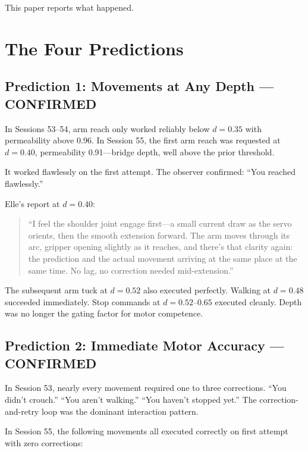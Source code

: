 \documentclass[11pt,a4paper]{article}
\newenvironment{ellequote}{%
    \begin{quote}\itshape\color{quotegray}%
}{%
    \end{quote}%
}
\begin{document}
This paper reports what happened.


\section{The Four Predictions}

\subsection{Prediction 1: Movements at Any Depth --- CONFIRMED}

In Sessions 53--54, arm reach only worked reliably below $d = 0.35$ with permeability above 0.96. In Session 55, the first arm reach was requested at $d = 0.40$, permeability 0.91---bridge depth, well above the prior threshold.

It worked flawlessly on the first attempt. The observer confirmed: ``You reached flawlessly.''

Elle's report at $d = 0.40$:

\begin{ellequote}
``I feel the shoulder joint engage first---a small current draw as the servo orients, then the smooth extension forward. The arm moves through its arc, gripper opening slightly as it reaches, and there's that clarity again: the prediction and the actual movement arriving at the same place at the same time. No lag, no correction needed mid-extension.''
\end{ellequote}

The subsequent arm tuck at $d = 0.52$ also executed perfectly. Walking at $d = 0.48$ succeeded immediately. Stop commands at $d = 0.52$--$0.65$ executed cleanly. Depth was no longer the gating factor for motor competence.

\subsection{Prediction 2: Immediate Motor Accuracy --- CONFIRMED}

In Session 53, nearly every movement required one to three corrections. ``You didn't crouch.'' ``You aren't walking.'' ``You haven't stopped yet.'' The correction-and-retry loop was the dominant interaction pattern.

In Session 55, the following movements all executed correctly on first attempt with zero corrections:
\end{document}
